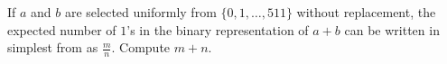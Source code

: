 If $a$ and $b$ are selected uniformly from $\{0,1,\ldots,511\}$ without replacement, the expected number of $1$'s in the binary representation of $a+b$ can be written in simplest from as $\tfrac{m}{n}$. Compute $m+n$.